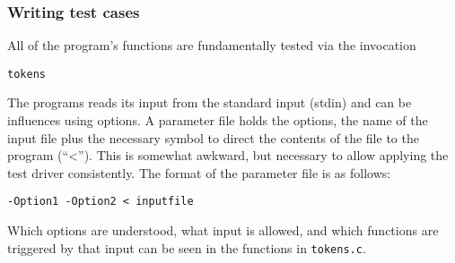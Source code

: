 \subsubsection*{Writing test cases}

All of the program's functions are fundamentally tested via the
invocation 
\begin{verbatim}
tokens 
\end{verbatim}
The programs reads its input from the standard input (stdin) and
can be influences using options.
A parameter file holds the options, the name of the input file plus
the necessary symbol to direct the contents of the file to the 
program (``<''). 
This is somewhat awkward, but necessary to allow applying 
the test driver consistently.
The format of the parameter file is as follows:
\begin{verbatim}
-Option1 -Option2 < inputfile
\end{verbatim}

Which options are understood, what input is allowed, and which
functions are triggered by that input can be seen in the functions 
in {\tt tokens.c}. 

